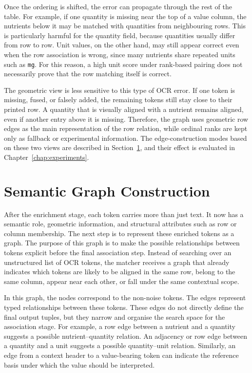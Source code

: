 Once the ordering is shifted, the error can propagate through the rest of the table. For example, if one quantity is missing near the top of a value column, the nutrients below it may be matched with quantities from neighbouring rows. This is particularly harmful for the quantity field, because quantities usually differ from row to row. Unit values, on the other hand, may still appear correct even when the row association is wrong, since many nutrients share repeated units such as \texttt{mg}. For this reason, a high unit score under rank-based pairing does not necessarily prove that the row matching itself is correct.

The geometric view is less sensitive to this type of OCR error. If one token is missing, fused, or falsely added, the remaining tokens still stay close to their printed row. A quantity that is visually aligned with a nutrient remains aligned, even if another entry above it is missing. Therefore, the graph uses geometric row edges as the main representation of the row relation, while ordinal ranks are kept only as fallback or experimental information. The edge-construction modes based on these two views are described in Section~\ref{sec:graph}, and their effect is evaluated in Chapter~\ref{chap:experiments}.

\section{Semantic Graph Construction}\label{sec:graph}

After the enrichment stage, each token carries more than just text. It now has a semantic role, geometric information, and structural attributes such as row or column membership. The next step is to represent these enriched tokens as a graph. The purpose of this graph is to make the possible relationships between tokens explicit before the final association step. Instead of searching over an unstructured list of OCR tokens, the matcher receives a graph that already indicates which tokens are likely to be aligned in the same row, belong to the same column, appear near each other, or fall under the same contextual scope.

In this graph, the nodes correspond to the non-noise tokens. The edges represent typed relationships between these tokens. These edges do not directly define the final output tuples, but they narrow and organise the search space for the association stage. For example, a row edge between a nutrient and a quantity suggests a possible nutrient--quantity relation. An adjacency or row edge between a quantity and a unit suggests a possible quantity--unit relation. Similarly, an edge from a context header to a value-bearing token can indicate the reference basis under which the value should be interpreted.

